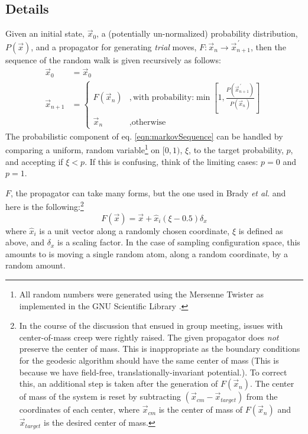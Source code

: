 \documentclass[letterpaper,12pt]{article}
\newcommand{\refeq}[1]{eq. \ref{eqn:#1}}
\begin{document}
\subsection{Details}\label{subsec:details}
Given an initial state, $\vec{x}_0$, a (potentially un-normalized) probability distribution, $P(\vec{x})$, and a propagator for generating \emph{trial} moves, $F:\vec{x}_n \to \vec{x}_{n+1}^{\,'}$, then the sequence of the random walk is given recursively as follows:
\begin{equation}\label{eqn:markovSequence}
\begin{aligned}
\vec{x}_0 &= \vec{x}_0 \\
\vec{x}_{n+1} &=
\begin{cases}
F(\vec{x}_n) &, \text{with probability:} \min \left[ 1,\frac{P(\vec{x}_{n+1}^{\,'})}{P(\vec{x}_{n})} \right] \\
\vec{x}_n &, \text{otherwise}
\end{cases}
\end{aligned}
\end{equation}
The probabilistic component of \refeq{markovSequence} can be handled by comparing a uniform, random variable\footnote{All random numbers were generated using the Mersenne Twister as implemented in the GNU Scientific Library \cite{gsl}.} on $[0,1)$, $\xi$, to the target probability, $p$, and accepting if $\xi<p$. If this is confusing, think of the limiting cases: $p=0$ and $p=1$.

$F$, the propagator can take many forms, but the one used in Brady \emph{et al.} \cite{doll:1981} and here is the following:\footnote{In the course of the discussion that ensued in group meeting, issues with center-of-mass creep were rightly raised. The given propagator does \emph{not} preserve the center of mass. This is inappropriate as the boundary conditions for the geodesic algorithm should have the same center of mass (This is because we have field-free, translationally-invariant potential.). To correct this, an additional step is taken after the generation of $F(\vec{x}_n)$. The center of mass of the system is reset by subtracting $(\vec{x}_{cm} - \vec{x}_{target})$ from the coordinates of each center, where $\vec{x}_{cm}$ is the center of mass of $F(\vec{x}_n)$ and $\vec{x}_{target}$ is the desired center of mass.}
\begin{equation}
F(\vec{x}) = \vec{x} + \hat{x}_i(\xi - 0.5){\delta}_{x}
\end{equation}
where $\hat{x}_i$ is a unit vector along a randomly chosen coordinate, $\xi$ is defined as above, and ${\delta}_{x}$ is a scaling factor. In the case of sampling configuration space, this amounts to is moving a single random atom, along a random coordinate, by a random amount.
\end{document}

